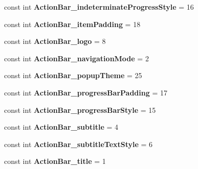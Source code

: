 \begin{DoxyCompactItemize}
const int {\bfseries Action\+Bar\+\_\+indeterminate\+Progress\+Style} = 16
\item 
\mbox{\label{classXaria_1_1Resource_1_1Styleable_a373296e5549e3b12143e2f1b9aaf7d84}} 
const int {\bfseries Action\+Bar\+\_\+item\+Padding} = 18
\item 
\mbox{\label{classXaria_1_1Resource_1_1Styleable_ad79b2d7b36cad85484adecbd409c8da2}} 
const int {\bfseries Action\+Bar\+\_\+logo} = 8
\item 
\mbox{\label{classXaria_1_1Resource_1_1Styleable_a1c2dbaea465a90eff7d65838036af69d}} 
const int {\bfseries Action\+Bar\+\_\+navigation\+Mode} = 2
\item 
\mbox{\label{classXaria_1_1Resource_1_1Styleable_a9e209e5e99f7a7a84852f4ccc5b8ce68}} 
const int {\bfseries Action\+Bar\+\_\+popup\+Theme} = 25
\item 
\mbox{\label{classXaria_1_1Resource_1_1Styleable_a24a9a2404cfe4a0d057337c72604d835}} 
const int {\bfseries Action\+Bar\+\_\+progress\+Bar\+Padding} = 17
\item 
\mbox{\label{classXaria_1_1Resource_1_1Styleable_ae39b70b5cf059203bfac5a475b3e5978}} 
const int {\bfseries Action\+Bar\+\_\+progress\+Bar\+Style} = 15
\item 
\mbox{\label{classXaria_1_1Resource_1_1Styleable_adeca92d55b3ce36acf0403c7a2ad371d}} 
const int {\bfseries Action\+Bar\+\_\+subtitle} = 4
\item 
\mbox{\label{classXaria_1_1Resource_1_1Styleable_aa432c612e377a456a9222f2d1f59b7c2}} 
const int {\bfseries Action\+Bar\+\_\+subtitle\+Text\+Style} = 6
\item 
\mbox{\label{classXaria_1_1Resource_1_1Styleable_abda5d50e7a2bab22441a46aba48cbc7e}} 
const int {\bfseries Action\+Bar\+\_\+title} = 1
\item 
\mbox{\label{classXaria_1_1Resource_1_1Styleable_a8c11fda43a334e74ec9f31e40bd86493}} 

\end{DoxyCompactItemize}
